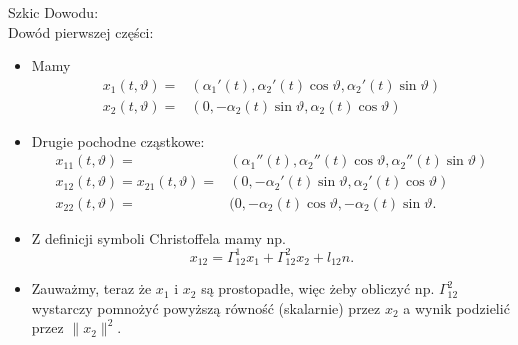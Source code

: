 \begin{frame}[allowdisplaybreaks=4,squeeze]
\textcolor{ared}{Szkic Dowodu:}\\\pause 
Dowód pierwszej części:
\begin{itemize}
\item Mamy \vspace*{-0.1in}
\begin{align*}
x_1(t,\vartheta)=&(\alpha_1'(t),\alpha_2'(t)\cos\vartheta,\alpha_2'(t)\sin\vartheta)\\
x_2(t,\vartheta)=&(0,-\alpha_2(t)\sin\vartheta,\alpha_2(t)\cos\vartheta)
\end{align*}\vspace*{-0.2in}
\pause \item Drugie pochodne cząstkowe:
\begin{align*}
x_{11}(t,\vartheta)=&(\alpha_1''(t),\alpha_2''(t)\cos\vartheta,\alpha_2''(t)\sin\vartheta)\\
x_{12}(t,\vartheta)=x_{21}(t,\vartheta)=&(0,-\alpha_2'(t)\sin\vartheta,\alpha_2'(t)\cos\vartheta)\\
x_{22}(t,\vartheta)=&(0,-\alpha_2(t)\cos\vartheta,-\alpha_2(t)\sin\vartheta.
\end{align*}\vspace*{-0.2in}
\pause \item Z definicji symboli Christoffela mamy np.
\[x_{12}=\Gamma_{12}^1x_1+\Gamma_{12}^2x_2+l_{12}n.\]

\pause\item Zauważmy, teraz że $x_1$ i $x_2$ są prostopadłe, więc żeby obliczyć np. $\Gamma_{12}^2$ wystarczy pomnożyć powyższą równość (skalarnie) przez $x_2$ a wynik podzielić przez $\|x_2\|^2$.
\end{itemize}
\end{frame}


